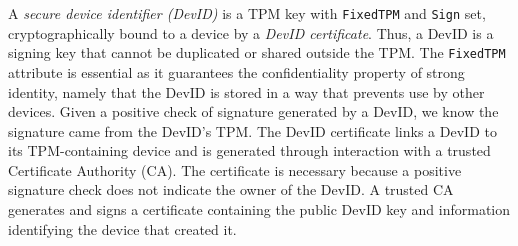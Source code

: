 \documentclass[runningheads]{llncs}
\begin{document}





A \emph{secure device identifier (DevID)} is a TPM key with
\verb|FixedTPM| and \verb|Sign| set, cryptographically bound to a
device by a \emph{DevID certificate}.  Thus, a DevID is a signing key
that cannot be duplicated or shared outside the TPM.  The
\verb|FixedTPM| attribute is essential as it guarantees the
confidentiality property of strong identity, namely that the DevID is
stored in a way that prevents use by other devices. Given a positive
check of signature generated by a DevID, we know the signature came
from the DevID's TPM.  The DevID certificate links a DevID to its
TPM-containing device and is generated through interaction with a
trusted Certificate Authority (CA).  The certificate is necessary
because a positive signature check does not indicate the owner of the
DevID.  A trusted CA generates and signs a certificate containing the
public DevID key and information identifying the device that created
it.
\end{document}

